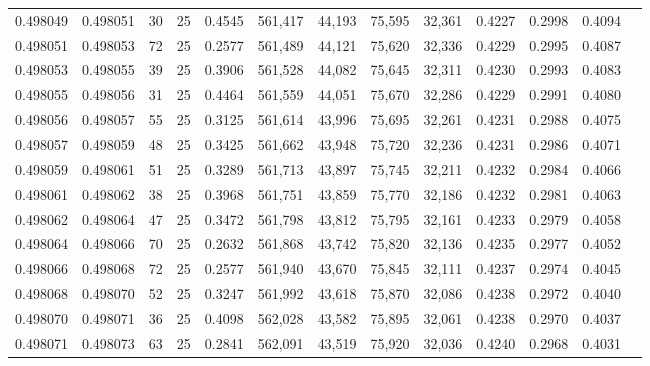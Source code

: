 \begin{tabular}{rrrrrrrrrrrrr}
0.498049 & 0.498051 &    30 &  25 &                                     0.4545 & 561,417 &  44,193 &  75,595 &  32,361 & 0.4227 & 0.2998 & 0.4094 \\
0.498051 & 0.498053 &    72 &  25 &                                     0.2577 & 561,489 &  44,121 &  75,620 &  32,336 & 0.4229 & 0.2995 & 0.4087 \\
0.498053 & 0.498055 &    39 &  25 &                                     0.3906 & 561,528 &  44,082 &  75,645 &  32,311 & 0.4230 & 0.2993 & 0.4083 \\
0.498055 & 0.498056 &    31 &  25 &                                     0.4464 & 561,559 &  44,051 &  75,670 &  32,286 & 0.4229 & 0.2991 & 0.4080 \\
0.498056 & 0.498057 &    55 &  25 &                                     0.3125 & 561,614 &  43,996 &  75,695 &  32,261 & 0.4231 & 0.2988 & 0.4075 \\
0.498057 & 0.498059 &    48 &  25 &                                     0.3425 & 561,662 &  43,948 &  75,720 &  32,236 & 0.4231 & 0.2986 & 0.4071 \\
0.498059 & 0.498061 &    51 &  25 &                                     0.3289 & 561,713 &  43,897 &  75,745 &  32,211 & 0.4232 & 0.2984 & 0.4066 \\
0.498061 & 0.498062 &    38 &  25 &                                     0.3968 & 561,751 &  43,859 &  75,770 &  32,186 & 0.4232 & 0.2981 & 0.4063 \\
0.498062 & 0.498064 &    47 &  25 &                                     0.3472 & 561,798 &  43,812 &  75,795 &  32,161 & 0.4233 & 0.2979 & 0.4058 \\
0.498064 & 0.498066 &    70 &  25 &                                     0.2632 & 561,868 &  43,742 &  75,820 &  32,136 & 0.4235 & 0.2977 & 0.4052 \\
0.498066 & 0.498068 &    72 &  25 &                                     0.2577 & 561,940 &  43,670 &  75,845 &  32,111 & 0.4237 & 0.2974 & 0.4045 \\
0.498068 & 0.498070 &    52 &  25 &                                     0.3247 & 561,992 &  43,618 &  75,870 &  32,086 & 0.4238 & 0.2972 & 0.4040 \\
0.498070 & 0.498071 &    36 &  25 &                                     0.4098 & 562,028 &  43,582 &  75,895 &  32,061 & 0.4238 & 0.2970 & 0.4037 \\
0.498071 & 0.498073 &    63 &  25 &                                     0.2841 & 562,091 &  43,519 &  75,920 &  32,036 & 0.4240 & 0.2968 & 0.4031 \\

\end{tabular}
